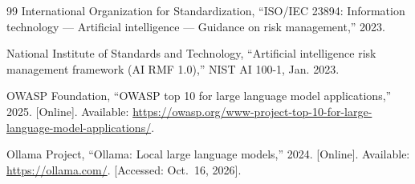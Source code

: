\documentclass[conference]{IEEEtran}
\begin{document}
\begin{thebibliography}{99}
{International Organization for Standardization},
``ISO/IEC 23894: Information technology --- Artificial intelligence ---
Guidance on risk management,'' 2023.

{National Institute of Standards and Technology},
``Artificial intelligence risk management framework (AI RMF 1.0),''
NIST AI 100-1, Jan. 2023.

{OWASP Foundation},
``OWASP top 10 for large language model applications,'' 2025. [Online].
Available:
\url{https://owasp.org/www-project-top-10-for-large-language-model-applications/}.

{Ollama Project}, ``Ollama: Local large language models,'' 2024. [Online].
Available: \url{https://ollama.com/}. [Accessed: Oct.~16, 2026].

\end{thebibliography}
\end{document}
